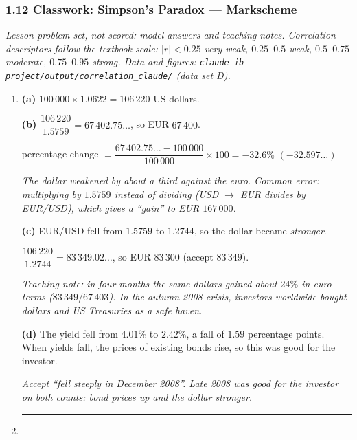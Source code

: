 \documentclass[12pt, twoside]{article}
\begin{document}
\subsubsection*{1.12 Classwork: Simpson's Paradox --- Markscheme}

\emph{Lesson problem set, not scored: model answers and teaching notes.
Correlation descriptors follow the textbook scale: $\lvert r \rvert < 0.25$
very weak, $0.25$--$0.5$ weak, $0.5$--$0.75$ moderate, $0.75$--$0.95$ strong.
Data and figures: \texttt{claude-ib-project/output/correlation\_claude/}
(data set D).}

\begin{enumerate}[itemsep=0.3cm]

\item[1.]

\textbf{(a)} $100\,000 \times 1.0622 = 106\,220$ US dollars.

\textbf{(b)} $\dfrac{106\,220}{1.5759} = 67\,402.75\ldots$, so EUR $67\,400$.

percentage change $= \dfrac{67\,402.75\ldots - 100\,000}{100\,000} \times 100
= -32.6\%$ \quad $(-32.597\ldots)$

\emph{The dollar weakened by about a third against the euro. Common error:
multiplying by $1.5759$ instead of dividing (USD $\to$ EUR divides by
EUR/USD), which gives a ``gain'' to EUR $167\,000$.}

\textbf{(c)} EUR/USD fell from $1.5759$ to $1.2744$, so the dollar became
\emph{stronger}.

$\dfrac{106\,220}{1.2744} = 83\,349.02\ldots$, so EUR $83\,300$ (accept
$83\,349$).

\emph{Teaching note: in four months the same dollars gained about $24\%$ in
euro terms ($83\,349 / 67\,403$). In the autumn 2008 crisis, investors
worldwide bought dollars and US Treasuries as a safe haven.}

\textbf{(d)} The yield fell from $4.01\%$ to $2.42\%$, a fall of $1.59$
percentage points. When yields fall, the prices of existing bonds rise, so
this was good for the investor.

\emph{Accept ``fell steeply in December 2008''. Late 2008 was good for the
investor on both counts: bond prices up and the dollar stronger.}

\bigskip \hrule \bigskip

\item[2.]


\end{enumerate}
\end{document}
